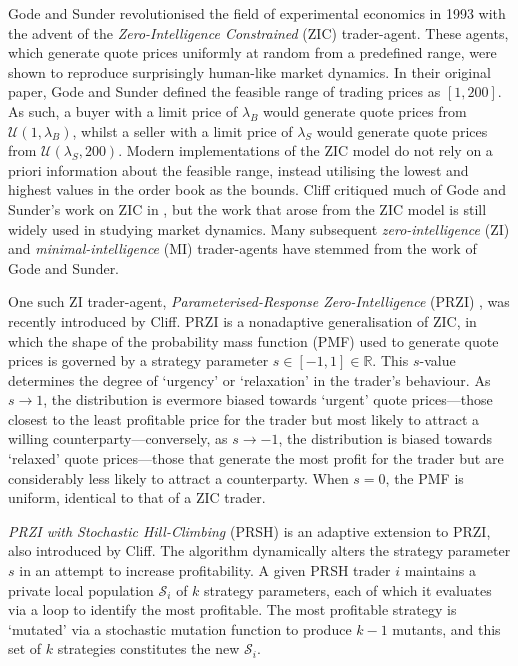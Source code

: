\documentclass[conference]{IEEEtran}
\begin{document}
Gode and Sunder \cite{GodeSunder} revolutionised the field of experimental economics in 1993 with the advent of the \textit{Zero-Intelligence Constrained} (ZIC) trader-agent.
These agents, which generate quote prices uniformly at random from a predefined range, were shown to reproduce surprisingly human-like market dynamics.
In their original paper, Gode and Sunder defined the feasible range of trading prices as $[1,  200]$.
As such, a buyer with a limit price of $\lambda_B$ would generate quote prices from $\mathcal{U}(1, \lambda_B)$, whilst a seller with a limit price of $\lambda_S$ would generate quote prices from $\mathcal{U}(\lambda_S, 200)$.
Modern implementations of the ZIC model do not rely on a priori information about the feasible range, instead utilising the lowest and highest values in the order book as the bounds.
Cliff critiqued much of Gode and Sunder's work on ZIC in \cite{ZIP}, but the work that arose from the ZIC model is still widely used in studying market dynamics.
Many subsequent \textit{zero-intelligence} (ZI) and \textit{minimal-intelligence} (MI) trader-agents have stemmed from the work of Gode and Sunder.

One such ZI trader-agent, \textit{Parameterised-Response Zero-Intelligence} (PRZI) \cite{PRZI}, was recently introduced by Cliff.
PRZI is a nonadaptive generalisation of ZIC, in which the shape of the probability mass function (PMF) used to generate quote prices is governed by a strategy parameter $s\in[-1, 1]\in\mathbb{R}$.
This $s$-value determines the degree of `urgency' or `relaxation' in the trader's behaviour.
As $s\to1$, the distribution is evermore biased towards `urgent' quote prices---those closest to the least profitable price for the trader but most likely to attract a willing counterparty---conversely, as $s\to-1$, the distribution is biased towards `relaxed' quote prices---those that generate the most profit for the trader but are considerably less likely to attract a counterparty.
When $s=0$, the PMF is uniform, identical to that of a ZIC trader.

\textit{PRZI with Stochastic Hill-Climbing} (PRSH) \cite{PRSH} is an adaptive extension to PRZI, also introduced by Cliff.
The algorithm dynamically alters the strategy parameter $s$ in an attempt to increase profitability.
A given PRSH trader $i$ maintains a private local population $\mathcal{S}_i$ of $k$ strategy parameters, each of which it evaluates via a loop to identify the most profitable.
The most profitable strategy is `mutated' via a stochastic mutation function to produce $k-1$ mutants, and this set of $k$ strategies constitutes the new $\mathcal{S}_i$.
\end{document}
